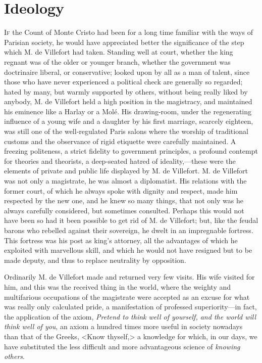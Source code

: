 \chapter{Ideology} 

 \lettrine{I}{f} the Count of Monte Cristo had been for a long time familiar with the ways of Parisian society, he would have appreciated better the significance of the step which M. de Villefort had taken. Standing well at court, whether the king regnant was of the older or younger branch, whether the government was doctrinaire liberal, or conservative; looked upon by all as a man of talent, since those who have never experienced a political check are generally so regarded; hated by many, but warmly supported by others, without being really liked by anybody, M. de Villefort held a high position in the magistracy, and maintained his eminence like a Harlay or a Molé. His drawing-room, under the regenerating influence of a young wife and a daughter by his first marriage, scarcely eighteen, was still one of the well-regulated Paris salons where the worship of traditional customs and the observance of rigid etiquette were carefully maintained. A freezing politeness, a strict fidelity to government principles, a profound contempt for theories and theorists, a deep-seated hatred of ideality,—these were the elements of private and public life displayed by M. de Villefort.  M. de Villefort was not only a magistrate, he was almost a diplomatist. His relations with the former court, of which he always spoke with dignity and respect, made him respected by the new one, and he knew so many things, that not only was he always carefully considered, but sometimes consulted. Perhaps this would not have been so had it been possible to get rid of M. de Villefort; but, like the feudal barons who rebelled against their sovereign, he dwelt in an impregnable fortress. This fortress was his post as king's attorney, all the advantages of which he exploited with marvellous skill, and which he would not have resigned but to be made deputy, and thus to replace neutrality by opposition. 

 Ordinarily M. de Villefort made and returned very few visits. His wife visited for him, and this was the received thing in the world, where the weighty and multifarious occupations of the magistrate were accepted as an excuse for what was really only calculated pride, a manifestation of professed superiority—in fact, the application of the axiom, \textit{Pretend to think well of yourself, and the world will think well of you}, an axiom a hundred times more useful in society nowadays than that of the Greeks, <Know thyself,> a knowledge for which, in our days, we have substituted the less difficult and more advantageous science of \textit{knowing others}. 

